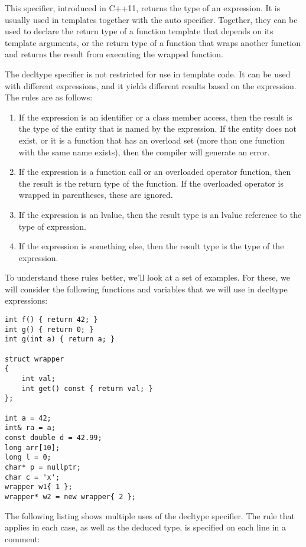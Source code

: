 This specifier, introduced in C++11, returns the type of an expression. It is usually used in templates together with the auto specifier. Together, they can be used to declare the return type of a function template that depends on its template arguments, or the return type of a function that wraps another function and returns the result from executing the wrapped function.

The decltype specifier is not restricted for use in template code. It can be used with different expressions, and it yields different results based on the expression. The rules are as follows:

\begin{enumerate}
\item
If the expression is an identifier or a class member access, then the result is the type of the entity that is named by the expression. If the entity does not exist, or it is a function that has an overload set (more than one function with the same name exists), then the compiler will generate an error.

\item
If the expression is a function call or an overloaded operator function, then the result is the return type of the function. If the overloaded operator is wrapped in parentheses, these are ignored.

\item
If the expression is an lvalue, then the result type is an lvalue reference to the type of expression.

\item
If the expression is something else, then the result type is the type of the expression.
\end{enumerate}

To understand these rules better, we’ll look at a set of examples. For these, we will consider the following functions and variables that we will use in decltype expressions:

\begin{lstlisting}[style=styleCXX]
int f() { return 42; }
int g() { return 0; }
int g(int a) { return a; }

struct wrapper
{
	int val;
	int get() const { return val; }
};

int a = 42;
int& ra = a;
const double d = 42.99;
long arr[10];
long l = 0;
char* p = nullptr;
char c = 'x';
wrapper w1{ 1 };
wrapper* w2 = new wrapper{ 2 };
\end{lstlisting}

The following listing shows multiple uses of the decltype specifier. The rule that applies in each case, as well as the deduced type, is specified on each line in a comment:

